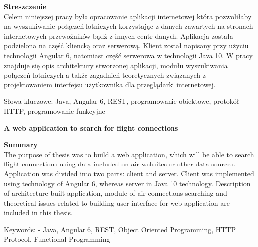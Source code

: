 \documentclass[12pt, twoside]{report}
\newcommand\tab[1][0.5cm]{\hspace*{#1}}
\newcommand\blankpage{%
	\null
    \thispagestyle{empty}%
    \newpage}
\begin{document}
\begin{flushleft}
	{\fontsize{14pt}{12pt}\selectfont
		\textbf{Streszczenie}}\\
	\vspace{1cm}
\tab Celem niniejszej pracy było opracowanie aplikacji internetowej która pozwoliłaby na wyszukiwanie połączeń lotniczych korzystając z danych zawartych na stronach internetowych przewoźników bądź z innych centr danych. Aplikacja została podzielona na część kliencką oraz serwerową. Klient został napisany przy użyciu technologii Angular 6, natomiast część serwerowa w technologii Java 10. W pracy znajduje się opis architektury stworzonej aplikacji, modułu wyszukiwania połączeń lotniczych a także zagadnień teoretycznych związanych z projektowaniem interfejsu użytkownika dla przeglądarki internetowej.
\end{flushleft}
\vspace{0.5cm}
Słowa kluczowe: Java, Angular 6, REST, programowanie obiektowe, protokół HTTP, programowanie funkcyjne

\vspace{1.5cm}

\begin{center}
	{\fontsize{14pt}{12pt}\selectfont
		\textbf{A web application to search for flight connections}}
\end{center}

\begin{flushleft}
	{\fontsize{14pt}{12pt}\selectfont
		\textbf{Summary}}\\
	\vspace{1cm}
\tab The purpose of thesis was to build a web application, which will be able to search flight connections using data included on air websites or other data sources. Application was divided into two parts: client and server. Client was implemented using technology of Angular 6, whereas server in Java 10 technology. Description of architecture built application, module of air connections searching and theoretical issues related to building user interface for web application are included in this thesis. 
\end{flushleft}
\vspace{0.5cm}
Keywords: - Java, Angular 6, REST, Object Oriented Programming, HTTP Protocol, Functional Programming
\afterpage{\blankpage}

\renewcommand{\contentsname}{Spis treści}
\newpage
{}
\setcounter{page}{9}
\tableofcontents
\newpage
\end{document}
